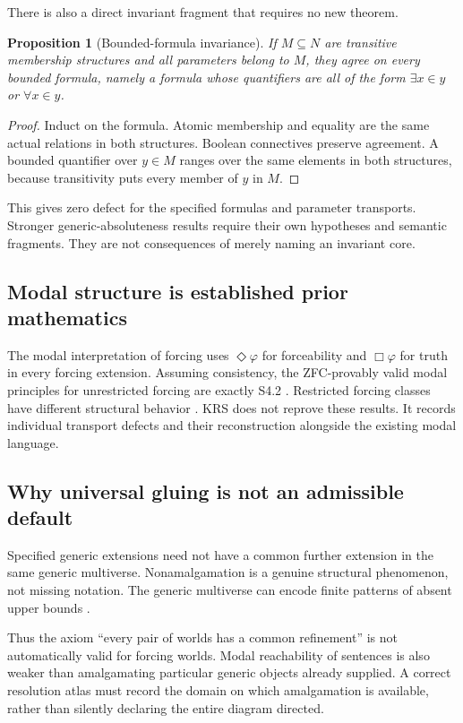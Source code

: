 \documentclass[11pt,letterpaper]{article}
\newtheorem{proposition}[theorem]{Proposition}
\theoremstyle{definition}
\begin{document}
There is also a direct invariant fragment that requires no new theorem.
\begin{proposition}[Bounded-formula invariance]\label{prop:delta0}
If $M\subseteq N$ are transitive membership structures and all parameters belong to $M$, they agree on every bounded formula, namely a formula whose quantifiers are all of the form $\exists x\in y$ or $\forall x\in y$.
\end{proposition}
\begin{proof}
Induct on the formula. Atomic membership and equality are the same actual relations in both structures. Boolean connectives preserve agreement. A bounded quantifier over $y\in M$ ranges over the same elements in both structures, because transitivity puts every member of $y$ in $M$.
\end{proof}
This gives zero defect for the specified formulas and parameter transports. Stronger generic-absoluteness results require their own hypotheses and semantic fragments. They are not consequences of merely naming an invariant core.

\subsection{Modal structure is established prior mathematics}
The modal interpretation of forcing uses $\Diamond\varphi$ for forceability and $\Box\varphi$ for truth in every forcing extension. Assuming consistency, the ZFC-provably valid modal principles for unrestricted forcing are exactly S4.2 \cite{hamkinslowe}. Restricted forcing classes have different structural behavior \cite{hamkinsleibmanlowe}. KRS does not reprove these results. It records individual transport defects and their reconstruction alongside the existing modal language.

\subsection{Why universal gluing is not an admissible default}
Specified generic extensions need not have a common further extension in the same generic multiverse. Nonamalgamation is a genuine structural phenomenon, not missing notation. The generic multiverse can encode finite patterns of absent upper bounds \cite{blockchains}.

Thus the axiom ``every pair of worlds has a common refinement'' is not automatically valid for forcing worlds. Modal reachability of sentences is also weaker than amalgamating particular generic objects already supplied. A correct resolution atlas must record the domain on which amalgamation is available, rather than silently declaring the entire diagram directed.
\end{document}

